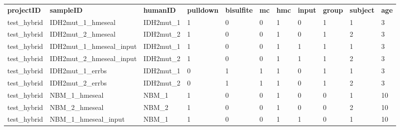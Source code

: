 \begin{sidewaystable}[!ht]
\small
\centering
\begin{tabular}{lllllllllll}
\textbf{projectID} & \textbf{sampleID}          & \textbf{humanID} & \textbf{pulldown} & \textbf{bisulfite} & \textbf{mc} & \textbf{hmc} & \textbf{input} & \textbf{group} & \textbf{subject} & \textbf{age} \\
test\_hybrid       & IDH2mut\_1\_hmeseal        & IDH2mut\_1       & 1                 & 0                  & 0           & 1            & 0              & 1              & 1                & 3            \\
test\_hybrid       & IDH2mut\_2\_hmeseal        & IDH2mut\_2       & 1                 & 0                  & 0           & 1            & 0              & 1              & 2                & 3            \\
test\_hybrid       & IDH2mut\_1\_hmeseal\_input & IDH2mut\_1       & 1                 & 0                  & 0           & 1            & 1              & 1              & 1                & 3            \\
test\_hybrid       & IDH2mut\_2\_hmeseal\_input & IDH2mut\_2       & 1                 & 0                  & 0           & 1            & 1              & 1              & 2                & 3            \\
test\_hybrid       & IDH2mut\_1\_errbs          & IDH2mut\_1       & 0                 & 1                  & 1           & 1            & 0              & 1              & 1                & 3            \\
test\_hybrid       & IDH2mut\_2\_errbs          & IDH2mut\_2       & 0                 & 1                  & 1           & 1            & 0              & 1              & 2                & 3            \\
test\_hybrid       & NBM\_1\_hmeseal            & NBM\_1           & 1                 & 0                  & 0           & 1            & 0              & 0              & 1                & 10           \\
test\_hybrid       & NBM\_2\_hmeseal            & NBM\_2           & 1                 & 0                  & 0           & 1            & 0              & 0              & 2                & 10           \\
test\_hybrid       & NBM\_1\_hmeseal\_input     & NBM\_1           & 1                 & 0                  & 0           & 1            & 1              & 0              & 1                & 10           \\

\end{tabular}
\end{sidewaystable}
